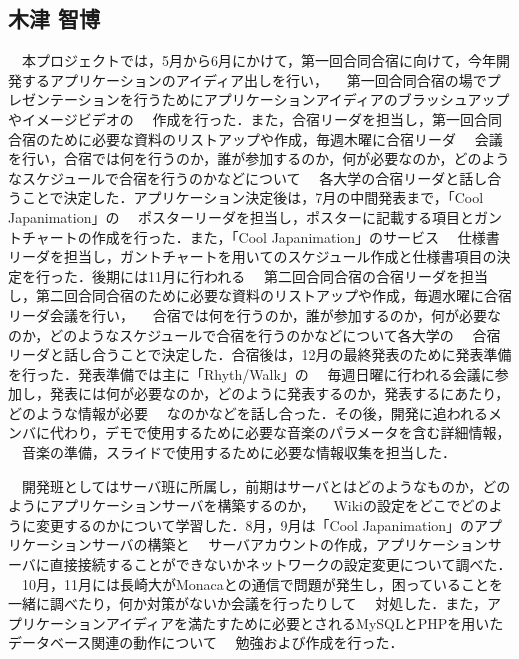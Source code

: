 \subsection{木津 智博}
\par
　本プロジェクトでは，5月から6月にかけて，第一回合同合宿に向けて，今年開発するアプリケーションのアイディア出しを行い，
　第一回合同合宿の場でプレゼンテーションを行うためにアプリケーションアイディアのブラッシュアップやイメージビデオの
　作成を行った．また，合宿リーダを担当し，第一回合同合宿のために必要な資料のリストアップや作成，毎週木曜に合宿リーダ
　会議を行い，合宿では何を行うのか，誰が参加するのか，何が必要なのか，どのようなスケジュールで合宿を行うのかなどについて
　各大学の合宿リーダと話し合うことで決定した．アプリケーション決定後は，7月の中間発表まで，「Cool Japanimation」の
　ポスターリーダを担当し，ポスターに記載する項目とガントチャートの作成を行った．また，「Cool Japanimation」のサービス
　仕様書リーダを担当し，ガントチャートを用いてのスケジュール作成と仕様書項目の決定を行った．後期には11月に行われる
　第二回合同合宿の合宿リーダを担当し，第二回合同合宿のために必要な資料のリストアップや作成，毎週水曜に合宿リーダ会議を行い，
　合宿では何を行うのか，誰が参加するのか，何が必要なのか，どのようなスケジュールで合宿を行うのかなどについて各大学の
　合宿リーダと話し合うことで決定した．合宿後は，12月の最終発表のために発表準備を行った．発表準備では主に「Rhyth/Walk」の
　毎週日曜に行われる会議に参加し，発表には何が必要なのか，どのように発表するのか，発表するにあたり，どのような情報が必要
　なのかなどを話し合った．その後，開発に追われるメンバに代わり，デモで使用するために必要な音楽のパラメータを含む詳細情報，
　音楽の準備，スライドで使用するために必要な情報収集を担当した．
\par
　開発班としてはサーバ班に所属し，前期はサーバとはどのようなものか，どのようにアプリケーションサーバを構築するのか，
　Wikiの設定をどこでどのように変更するのかについて学習した．8月，9月は「Cool Japanimation」のアプリケーションサーバの構築と
　サーバアカウントの作成，アプリケーションサーバに直接接続することができないかネットワークの設定変更について調べた．
　10月，11月には長崎大がMonacaとの通信で問題が発生し，困っていることを一緒に調べたり，何か対策がないか会議を行ったりして
　対処した．また，アプリケーションアイディアを満たすために必要とされるMySQLとPHPを用いたデータベース関連の動作について
　勉強および作成を行った．
\par

